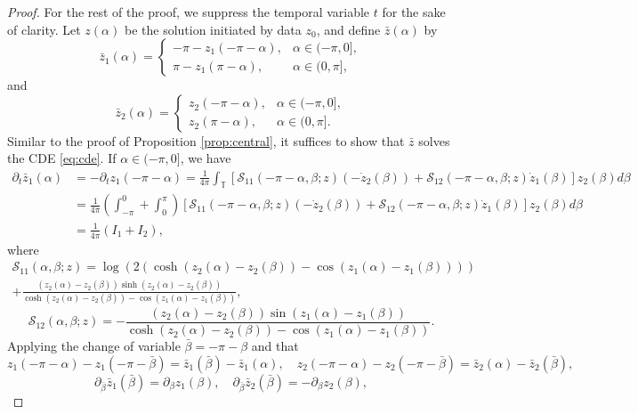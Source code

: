 \documentclass[11pt]{article}
\numberwithin{equation}{section}
\newcommand{\T}{\mathbb{T}}
\newcommand{\calS}{\mathcal{S}}
\newcommand{\dotz}{\dot{z}}
\newcommand{\p}{\partial}
\begin{document}
\begin{proof}
    For the rest of the proof, we suppress the temporal variable $t$ for the sake of clarity. Let $z(\alpha)$ be the solution initiated by data $z_0$, and define $\bar{z}(\alpha)$ by
    $$
    \bar{z}_1(\alpha) = \begin{cases}
        -\pi - z_1(-\pi - \alpha),&\alpha \in (-\pi,0],\\
        \pi - z_1(\pi-\alpha),&\alpha \in (0,\pi],
    \end{cases}
    $$
    and
    $$
    \bar{z}_2(\alpha) = \begin{cases}
        z_2(-\pi - \alpha),&\alpha \in (-\pi,0],\\
        z_2(\pi-\alpha),&\alpha \in (0,\pi].
    \end{cases}
    $$
    Similar to the proof of Proposition \ref{prop:central}, it suffices to show that $\bar{z}$ solves the CDE \eqref{eq:cde}. If $\alpha \in (-\pi,0]$, we have
    \begin{align*}
    \p_t \bar{z}_1(\alpha) &= -\p_tz_1(-\pi-\alpha) = \frac{1}{4\pi}\int_\T \left[\calS_{11}(-\pi-\alpha,\beta;z)(-\dotz_2(\beta)) + \calS_{12}(-\pi -\alpha,\beta;z)\dotz_1(\beta)\right]z_2(\beta)d\beta\\
    &= \frac{1}{4\pi}\left(\int_{-\pi}^0 + \int_0^\pi \right)\left[\calS_{11}(-\pi-\alpha,\beta;z)(-\dotz_2(\beta)) + \calS_{12}(-\pi -\alpha,\beta;z)\dotz_1(\beta)\right]z_2(\beta)d\beta\\
    &= \frac{1}{4\pi}(I_1 + I_2),
    \end{align*}
    where
    \begin{align*}
    \calS_{11}(\alpha,\beta;z) = \log\left(2(\cosh(z_2(\alpha) - z_2(\beta))- \cos(z_1(\alpha) - z_1(\beta)))\right)\\
    + \frac{(z_2(\alpha) - z_2(\beta))\sinh(z_2(\alpha) - z_2(\beta))}{\cosh(z_2(\alpha) - z_2(\beta)) - \cos(z_1(\alpha) - z_1(\beta))},
    \end{align*}
    $$
    \calS_{12}(\alpha,\beta;z) = - \frac{(z_2(\alpha)-z_2(\beta))\sin(z_1(\alpha) - z_1(\beta))}{\cosh(z_2(\alpha) - z_2(\beta)) - \cos(z_1(\alpha) - z_1(\beta))}.
    $$
    Applying the change of variable $\bar\beta = -\pi - \beta$ and that
    $$
    z_1(-\pi-\alpha) - z_1(-\pi - \bar\beta) = \bar{z}_1(\bar\beta) - \bar{z}_1(\alpha),\quad
    z_2(-\pi - \alpha) - z_2(-\pi - \bar\beta) = \bar{z}_2(\alpha) - \bar{z}_2(\bar\beta),
    $$
    $$
    \p_{\bar\beta}\bar{z}_1(\bar\beta) = \p_\beta z_1(\beta),\quad \p_{\bar\beta}\bar{z}_2(\bar\beta) = -\p_\beta z_2(\beta),
$$
\end{proof}
\end{document}
